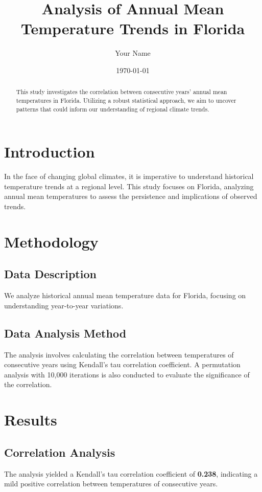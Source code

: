 \documentclass{article}
\title{Analysis of Annual Mean Temperature Trends in Florida}
\author{Your Name}
\date{\today}
\begin{document}
\maketitle

\begin{abstract}
This study investigates the correlation between consecutive years' annual mean temperatures in Florida. Utilizing a robust statistical approach, we aim to uncover patterns that could inform our understanding of regional climate trends.
\end{abstract}

\section{Introduction}
In the face of changing global climates, it is imperative to understand historical temperature trends at a regional level. This study focuses on Florida, analyzing annual mean temperatures to assess the persistence and implications of observed trends.

\section{Methodology}
\subsection{Data Description}
We analyze historical annual mean temperature data for Florida, focusing on understanding year-to-year variations.

\subsection{Data Analysis Method}
The analysis involves calculating the correlation between temperatures of consecutive years using Kendall's tau correlation coefficient. A permutation analysis with 10,000 iterations is also conducted to evaluate the significance of the correlation.

\section{Results}
\subsection{Correlation Analysis}
The analysis yielded a Kendall's tau correlation coefficient of \textbf{0.238}, indicating a mild positive correlation between temperatures of consecutive years.
\end{document}
